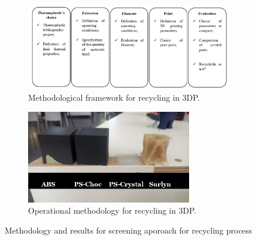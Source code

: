 \begin{figure}[H]
	\centering
	
	\begin{subfigure}{0.55\textwidth}
		\includegraphics[width=\textwidth]{Figures/Antonio/Methodology.pdf}
		\caption{Methodological framework for recycling in 3DP.}
		\label{Methodology.Antonio}
	\end{subfigure}
	\hfill
	\begin{subfigure}{0.4\textwidth}
		\includegraphics[width=0.8\textwidth]{Figures/Antonio/Final-Results.png} 
		\caption{Operational methodology for recycling in 3DP.}
		\label{Results.Antonio}		
	\end{subfigure}

	
	\caption{Methodology and results for screening aporoach for recycling process}
	\label{Research.Antonio}
\end{figure}